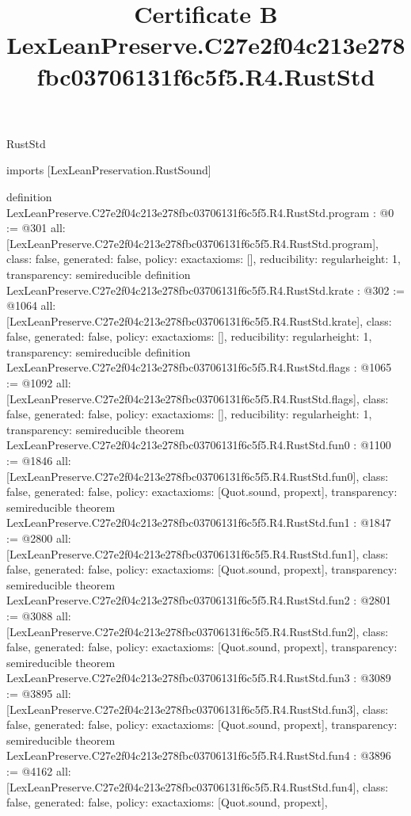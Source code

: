 \begin{lexlean}{RustStd}
\title{Certificate B LexLeanPreserve.C27e2f04c213e278fbc03706131f6c5f5.R4.RustStd}
\begin{coremodule}
imports [LexLeanPreservation.RustSound]

definition LexLeanPreserve.C27e2f04c213e278fbc03706131f6c5f5.R4.RustStd.program : @0 := @301 {
  all: [LexLeanPreserve.C27e2f04c213e278fbc03706131f6c5f5.R4.RustStd.program],
  class: false,
  generated: false,
  policy: exact{axioms: []},
  reducibility: regular{height: 1},
  transparency: semireducible
}
definition LexLeanPreserve.C27e2f04c213e278fbc03706131f6c5f5.R4.RustStd.krate : @302 := @1064 {
  all: [LexLeanPreserve.C27e2f04c213e278fbc03706131f6c5f5.R4.RustStd.krate],
  class: false,
  generated: false,
  policy: exact{axioms: []},
  reducibility: regular{height: 1},
  transparency: semireducible
}
definition LexLeanPreserve.C27e2f04c213e278fbc03706131f6c5f5.R4.RustStd.flags : @1065 := @1092 {
  all: [LexLeanPreserve.C27e2f04c213e278fbc03706131f6c5f5.R4.RustStd.flags],
  class: false,
  generated: false,
  policy: exact{axioms: []},
  reducibility: regular{height: 1},
  transparency: semireducible
}
theorem LexLeanPreserve.C27e2f04c213e278fbc03706131f6c5f5.R4.RustStd.fun0 : @1100 := @1846 {
  all: [LexLeanPreserve.C27e2f04c213e278fbc03706131f6c5f5.R4.RustStd.fun0],
  class: false,
  generated: false,
  policy: exact{axioms: [Quot.sound, propext]},
  transparency: semireducible
}
theorem LexLeanPreserve.C27e2f04c213e278fbc03706131f6c5f5.R4.RustStd.fun1 : @1847 := @2800 {
  all: [LexLeanPreserve.C27e2f04c213e278fbc03706131f6c5f5.R4.RustStd.fun1],
  class: false,
  generated: false,
  policy: exact{axioms: [Quot.sound, propext]},
  transparency: semireducible
}
theorem LexLeanPreserve.C27e2f04c213e278fbc03706131f6c5f5.R4.RustStd.fun2 : @2801 := @3088 {
  all: [LexLeanPreserve.C27e2f04c213e278fbc03706131f6c5f5.R4.RustStd.fun2],
  class: false,
  generated: false,
  policy: exact{axioms: [Quot.sound, propext]},
  transparency: semireducible
}
theorem LexLeanPreserve.C27e2f04c213e278fbc03706131f6c5f5.R4.RustStd.fun3 : @3089 := @3895 {
  all: [LexLeanPreserve.C27e2f04c213e278fbc03706131f6c5f5.R4.RustStd.fun3],
  class: false,
  generated: false,
  policy: exact{axioms: [Quot.sound, propext]},
  transparency: semireducible
}
theorem LexLeanPreserve.C27e2f04c213e278fbc03706131f6c5f5.R4.RustStd.fun4 : @3896 := @4162 {
  all: [LexLeanPreserve.C27e2f04c213e278fbc03706131f6c5f5.R4.RustStd.fun4],
  class: false,
  generated: false,
  policy: exact{axioms: [Quot.sound, propext]},
}
\end{coremodule}
\end{lexlean}
